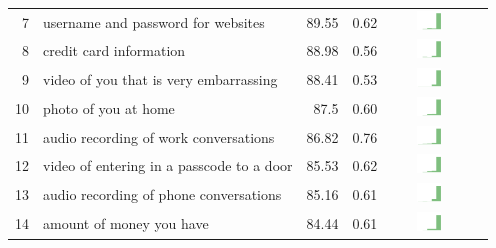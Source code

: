 \begin{table}[t]
\begin{center}
\begin{tabular}{| r | l | r | r | r | r |}
7 & username and password for websites & 89.55 & 0.62 & \includegraphics[width = 2cm, height = 0.5cm]{tex-inputs/table-images/learnedyourusernameandpasswordforwebsitescombined} \\ 
8 & credit card information & 88.98 & 0.56 & \includegraphics[width = 2cm, height = 0.5cm]{tex-inputs/table-images/learnedyourcreditcardinformationcombined} \\ 
9 & video of you that is very embarrassing & 88.41 & 0.53 & \includegraphics[width = 2cm, height = 0.5cm]{tex-inputs/table-images/tookanincriminatingvideoofyoudoingsomethingembarrassingcombined} \\ 
10 & photo of you at home & 87.5 &0.60 & \includegraphics[width = 2cm, height = 0.5cm]{tex-inputs/table-images/tookphotosofyou(withaninward-facingcamera)athomecombined} \\ 
11 & audio recording of work conversations & 86.82 & 0.76 & \includegraphics[width = 2cm, height = 0.5cm]{tex-inputs/table-images/recordedyourworkconversationscombined} \\ 
12 & video of entering in a passcode to a door & 85.53 & 0.62 & \includegraphics[width = 2cm, height = 0.5cm]{tex-inputs/table-images/tookavideoofyouenteringinadigitalpasscodetoalockeddoorcombined} \\ 
13 & audio recording of phone conversations & 85.16 & 0.61 &  \includegraphics[width = 2cm, height = 0.5cm]{tex-inputs/table-images/recordedyourphoneconversationscombined} \\ 
14 & amount of money you have & 84.44 & 0.61 & \includegraphics[width = 2cm, height = 0.5cm]{tex-inputs/table-images/learnedhowmuchmoneyyouhavecombined} \\ 

\end{tabular}
\end{center}
\end{table}
